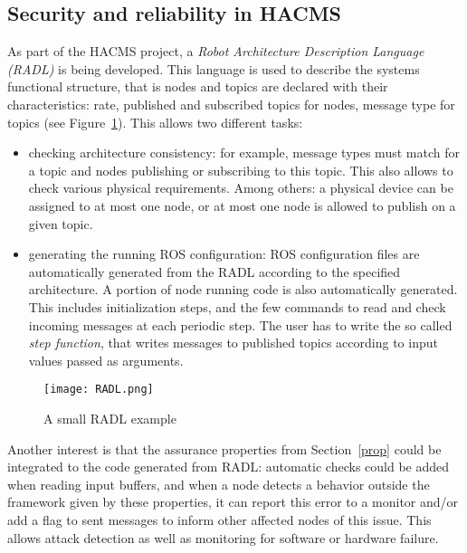 \subsection{Security and reliability in HACMS}

As part of the HACMS project, a \emph{Robot Architecture Description Language (RADL)} is being developed.
This language is used to describe the systems functional structure, that is nodes and topics are declared with their characteristics: rate, published and subscribed topics for nodes, message type for topics (see Figure~\ref{RADL}).
This allows two different tasks:

\begin{itemize}
\item checking architecture consistency: for example, message types must match for a topic and nodes publishing or subscribing to this topic.
This also allows to check various physical requirements. Among others: a physical device can be assigned to at most one node, or at most one node is allowed to publish on a given topic.

\item generating the running ROS configuration: ROS configuration files are automatically generated from the RADL according to the specified architecture.
A portion of node running code is also automatically generated. This includes initialization steps, and the few commands to read and check incoming messages at each periodic step.
The user has to write the so called \emph{step function}, that writes messages to published topics according to input values passed as arguments.
\end{itemize}

\begin{figure}[ht]
\begin{center}
\texttt{[image: RADL.png]}
\caption{A small RADL example}\label{RADL}
\end{center}
\end{figure}

Another interest is that the assurance properties from Section~\ref{prop} could be integrated to the code generated from RADL:
automatic checks could be added when reading input buffers, and when a node detects a behavior outside the framework given by these properties, it can report this error to a monitor and/or add a flag to sent messages to inform other affected nodes of this issue.
This allows attack detection as well as monitoring for software or hardware failure.

